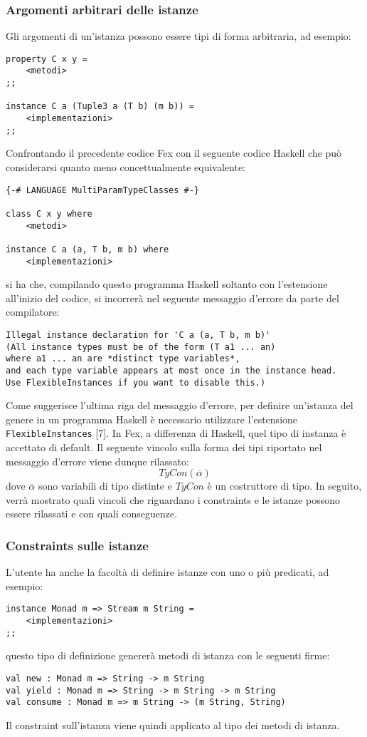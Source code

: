 \documentclass[10pt,a4paper]{article}
\begin{document}
\subsubsection{Argomenti arbitrari delle istanze}
Gli argomenti di un'istanza possono essere tipi di forma arbitraria, ad esempio:
\begin{lstlisting}
property C x y =
    <metodi>
;;

instance C a (Tuple3 a (T b) (m b)) =
    <implementazioni>
;;
\end{lstlisting}
Confrontando il precedente codice Fex con il seguente codice Haskell che può considerarsi quanto meno concettualmente
equivalente:
\begin{lstlisting}
{-# LANGUAGE MultiParamTypeClasses #-}

class C x y where
    <metodi>

instance C a (a, T b, m b) where
    <implementazioni>
\end{lstlisting}
si ha che, compilando questo programma Haskell soltanto con l'estensione all'inizio del codice, si incorrerà nel
seguente messaggio d'errore da parte del compilatore:
\begin{lstlisting}
Illegal instance declaration for 'C a (a, T b, m b)'
(All instance types must be of the form (T a1 ... an)
where a1 ... an are *distinct type variables*,
and each type variable appears at most once in the instance head.
Use FlexibleInstances if you want to disable this.)
\end{lstlisting}
Come suggerisce l'ultima riga del messaggio d'errore, per definire un'istanza del genere in un programma Haskell è
necessario utilizzare l'estensione \texttt{FlexibleInstances} [7]. In Fex, a differenza di Haskell, quel tipo di instanza
è accettato di default. Il seguente vincolo sulla forma dei tipi riportato nel messaggio d'errore viene dunque rilassato:
    \[ TyCon(\overline{\alpha}) \]
dove $ \overline{\alpha} $ sono variabili di tipo distinte e $ TyCon $ è un costruttore di tipo. In seguito, verrà
mostrato quali vincoli che riguardano i constraints e le istanze possono essere rilassati e con quali conseguenze.

\subsubsection{Constraints sulle istanze}
L'utente ha anche la facoltà di definire istanze con uno o più predicati, ad esempio:
\begin{lstlisting}
instance Monad m => Stream m String =
    <implementazioni>
;;
\end{lstlisting}
questo tipo di definizione genererà metodi di istanza con le seguenti firme:
\begin{lstlisting}
val new : Monad m => String -> m String
val yield : Monad m => String -> m String -> m String
val consume : Monad m => m String -> (m String, String)
\end{lstlisting}
Il constraint sull'istanza viene quindi applicato al tipo dei metodi di istanza.
\end{document}
